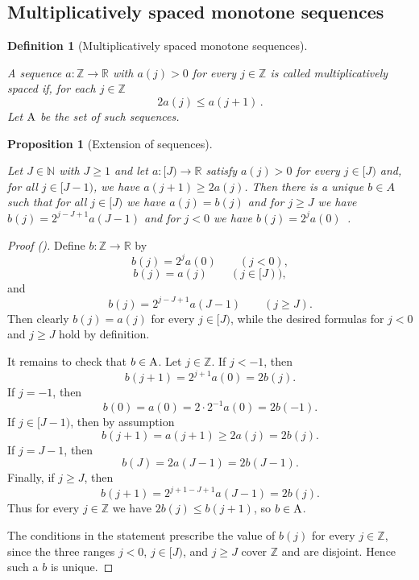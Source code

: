 \documentclass[12pt,reqno]{amsart}
\newcommand{\auto}{{({\tiny\faCar})}}
\theoremstyle{plain}
\newtheorem{proposition}[theorem]{Proposition}
\newtheorem{definition}[theorem]{Definition}
\numberwithin{equation}{section}
\theoremstyle{remark}
\newcommand{\uses}[1]{}
\newcommand{\usesdefs}[1]{}
\newcommand{\leanok}{}
\newcommand{\lean}[1]{}
\newcommand{\Z}{{\mathbb Z}}
\newcommand{\R}{{\mathbb R}}
\newcommand{\N}{{\mathbb N}}
\begin{document}
\subsection{Multiplicatively spaced monotone sequences}

\begin{definition}[Multiplicatively spaced monotone sequences]\label{multiplicatively spaced monotone sequences}\uses{}\usesdefs{}
\lean{Auto.SpacedSequence,Auto.A}
A sequence $a:\Z\to\R$ with $a(j)>0$ for every $j\in\Z$ is called multiplicatively spaced if, for each $j\in\Z$
\begin{equation}\label{auto:spaced-sequence-growth}
    2a(j)\le a(j+1)\, .
\end{equation}
Let ${\rm A}$ be the set of such sequences.
\end{definition}


\begin{proposition}[Extension of sequences]\label{Extension of sequences}\uses{}\usesdefs{multiplicatively spaced monotone sequences}
\lean{Auto.extensionOfSequences}
\leanok
Let $J\in\N$ with $J\ge1$ and let $a:[J)\to\R$ satisfy $a(j)>0$ for every $j\in[J)$ and, for all $j\in[J-1)$, we have $a(j+1)\ge 2a(j)$.
Then there is a unique $b\in A$ such that for all $j\in [J)$ we have $a(j)=b(j)$ and for $j\ge J$ we have $b(j)=2^{j-J+1} a(J-1)$ and for $j<0$ we have $b(j)=2^j a(0)$\, .
\end{proposition}
\begin{proof}[Proof \auto]
Define $b:\Z\to\R$ by
\[
b(j)=2^ja(0)\qquad(j<0),
\]
\[
b(j)=a(j)\qquad(j\in[J)),
\]
and
\[
b(j)=2^{j-J+1}a(J-1)\qquad(j\ge J).
\]
Then clearly $b(j)=a(j)$ for every $j\in[J)$, while the desired formulas for
$j<0$ and $j\ge J$ hold by definition.

It remains to check that $b\in {\rm A}$. Let $j\in\Z$. If $j<-1$, then
\[
 b(j+1)=2^{j+1}a(0)=2b(j).
\]
If $j=-1$, then
\[
 b(0)=a(0)=2\cdot 2^{-1}a(0)=2b(-1).
\]
If $j\in [J-1)$, then by assumption
\[
 b(j+1)=a(j+1)\ge 2a(j)=2b(j).
\]
If $j=J-1$, then
\[
 b(J)=2a(J-1)=2b(J-1).
\]
Finally, if $j\ge J$, then
\[
 b(j+1)=2^{j+1-J+1}a(J-1)=2b(j).
\]
Thus for every $j\in\Z$ we have $2b(j)\le b(j+1)$, so $b\in{\rm A}$.

The conditions in the statement prescribe the value of $b(j)$ for every
$j\in\Z$, since the three ranges $j<0$, $j\in[J)$, and $j\ge J$ cover
$\Z$ and are disjoint. Hence such a $b$ is unique.
\end{proof}
\end{document}
